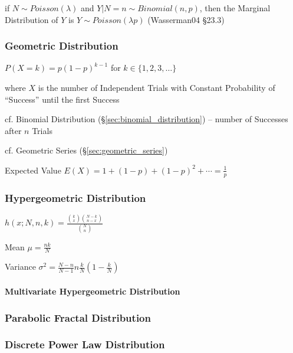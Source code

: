 if $N \sim Poisson(\lambda)$ and $Y | N = n \sim Binomial(n,p)$, then the
Marginal Distribution of $Y$ is $Y \sim Poisson(\lambda p)$
(Wasserman04 \S 23.3)



\subsubsection{Geometric Distribution}\label{sec:geometric_distribution}

$P(X = k) = p(1-p)^{k-1}$ for $k \in \{1, 2, 3, \ldots\}$

where $X$ is the number of Independent Trials with Constant Probability of
``Success'' until the first Success

cf. Binomial Distribution (\S\ref{sec:binomial_distribution}) -- number of
Successes after $n$ Trials

cf. Geometric Series (\S\ref{sec:geometric_series})

Expected Value $E(X) = 1 + (1-p) + (1-p)^2 + \cdots = \frac{1}{p}$



\subsubsection{Hypergeometric Distribution}
\label{sec:hypergeometric_distribution}

$h(x; N, n, k) = \frac{\binom{k}{x} \binom{N-k}{n-x}}{\binom{N}{n}}$

Mean $\mu = \frac{nk}{N}$

Variance $\sigma^2 = \frac{N-n}{N-1} n \frac{k}{N}(1 - \frac{k}{N})$



\paragraph{Multivariate Hypergeometric Distribution}
\label{sec:multivariate_hypergeometric}\hfill



\subsubsection{Parabolic Fractal Distribution}
\label{sec:parabolic_fractal_distribution}

\subsubsection{Discrete Power Law Distribution}
\label{sec:discrete_power_law_distribution}

